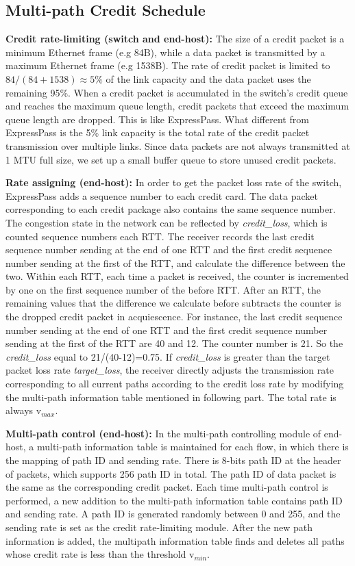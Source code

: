 \documentclass[conference,compsoc]{IEEEtran}
\begin{document}
\subsection{Multi-path Credit Schedule}
\textbf{Credit rate-limiting (switch and end-host):} The size of a credit packet is a minimum Ethernet frame (e.g 84B), while a data packet is transmitted by a maximum Ethernet frame (e.g 1538B). The rate of credit packet is limited to $84/(84+1538)\approx 5\%$ of the link capacity and the data packet uses the remaining 95\%. When a credit packet is accumulated in the switch's credit queue and reaches the maximum queue length, credit packets that exceed the maximum queue length are dropped. This is like ExpressPass. What different from ExpressPass is the 5\% link capacity is the total rate of the credit packet transmission over multiple links. Since data packets are not always transmitted at 1 MTU full size, we set up a small buffer queue to store unused credit packets.

\textbf{Rate assigning (end-host):} In order to get the packet loss rate of the switch, ExpressPass adds a sequence number to each credit card. The data packet corresponding to each credit package also contains the same sequence number. The congestion state in the network can be reflected by \emph{credit\_loss}, which is counted sequence numbers each RTT. The receiver records the last credit sequence number sending at the end of one RTT and the first credit sequence number sending at the first of the RTT, and calculate the difference between the two. Within each RTT, each time a packet is received, the counter is incremented by one on the first sequence number of the before RTT. After an RTT, the remaining values that the difference we calculate before subtracts the counter is the dropped credit packet in acquiescence. For instance, the last credit sequence number sending at the end of one RTT and the first credit sequence number sending at the first of the RTT are 40 and 12. The counter number is 21. So the \emph{credit\_loss} equal to 21/(40-12)=0.75. If \emph{credit\_loss} is greater than the target packet loss rate \emph{target\_loss}, the receiver directly adjusts the transmission rate corresponding to all current paths according to the credit loss rate by modifying the multi-path information table mentioned in following part. The total rate is always v$_{max}$.

\textbf{Multi-path control (end-host):} In the multi-path controlling module of end-host, a multi-path information table is maintained for each flow, in which there is the mapping of path ID and sending rate. There is 8-bits path ID at the header of packets, which supports 256 path ID in total. The path ID of data packet is the same as the corresponding credit packet.  Each time multi-path control is performed, a new addition to the multi-path information table contains path ID and sending rate. A path ID is generated randomly between 0 and 255, and the sending rate is set as the credit rate-limiting module. After the new path information is added, the multipath information table finds and deletes all paths whose credit rate is less than the threshold v$_{min}$.
\end{document}
